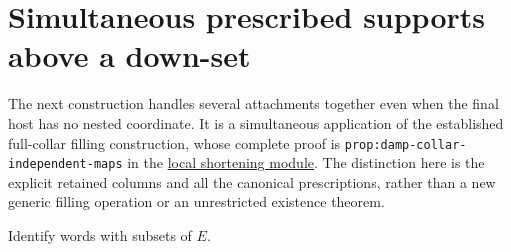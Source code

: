 \documentclass[11pt]{article}
\theoremstyle{definition}
\begin{document}
\section{Simultaneous prescribed supports above a down-set}
\label{sec:guarded-tips}
The next construction handles several attachments together even when
the final host has no nested coordinate. It is a simultaneous application
of the established full-collar filling construction, whose complete proof
is \texttt{prop:damp-collar-independent-maps} in the
\href{../../dismantlable-ample/sections/classification/local_extenture_shortening.tex}
{local shortening module}. The distinction here is the explicit retained
columns and all the canonical prescriptions, rather than a new generic
filling operation or an unrestricted existence theorem.

Identify words with subsets of $E$.
\end{document}
